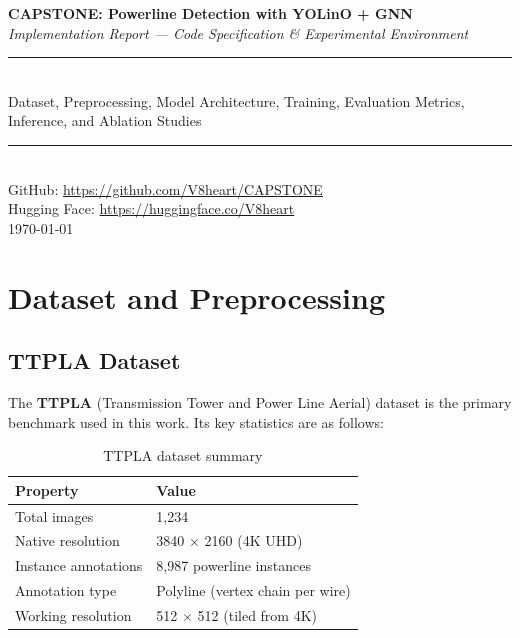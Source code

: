 \documentclass[11pt,a4paper]{article}
\begin{document}
\begin{titlepage}
  \centering
  \vspace*{2cm}
  {\LARGE \bfseries CAPSTONE: Powerline Detection with YOLinO + GNN\\[0.5em]}
  {\large \textit{Implementation Report --- Code Specification \& Experimental Environment}}\\[2em]
  \rule{\linewidth}{0.5pt}\\[1em]
  {\large Dataset, Preprocessing, Model Architecture, Training, Evaluation Metrics,\\
          Inference, and Ablation Studies}\\[1em]
  \rule{\linewidth}{0.5pt}\\[3em]
  {\large GitHub: \url{https://github.com/V8heart/CAPSTONE}}\\[0.5em]
  {\large Hugging Face: \url{https://huggingface.co/V8heart}}\\[3em]
  \vfill
  {\normalsize \today}
\end{titlepage}

\tableofcontents
\newpage

\section{Dataset and Preprocessing}
\label{sec:dataset}

\subsection{TTPLA Dataset}
\label{subsec:ttpla}

The \textbf{TTPLA} (Transmission Tower and Power Line Aerial) dataset is the primary
benchmark used in this work. Its key statistics are as follows:

\begin{table}[H]
\centering
\caption{TTPLA dataset summary}
\begin{tabular}{ll}
\toprule
Property & Value \\
\midrule
Total images & 1,234 \\
Native resolution & 3840 $\times$ 2160 (4K UHD) \\
Instance annotations & 8,987 powerline instances \\
Annotation type & Polyline (vertex chain per wire) \\
Working resolution & 512 $\times$ 512 (tiled from 4K) \\
\bottomrule
\end{tabular}
\end{table}
\end{document}
